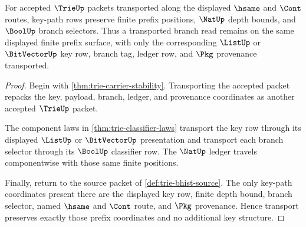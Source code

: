 \begin{theorem}\label{thm:trie-key-prefix-transport}
For accepted $\TrieUp$ packets transported along the displayed $\hsame$ and
$\Cont$ routes, key-path rows preserve finite prefix positions, $\NatUp$ depth
bounds, and $\BoolUp$ branch selectors. Thus a transported branch read remains
on the same displayed finite prefix surface, with only the corresponding
$\ListUp$ or $\BitVectorUp$ key row, branch tag, ledger row, and $\Pkg$
provenance transported.
\end{theorem}
\begin{proof}
Begin with \autoref{thm:trie-carrier-stability}. Transporting the accepted
packet repacks the key, payload, branch, ledger, and provenance coordinates as
another accepted $\TrieUp$ packet.

The component laws in \autoref{thm:trie-classifier-laws} transport the key row
through its displayed $\ListUp$ or $\BitVectorUp$ presentation and transport
each branch selector through its $\BoolUp$ classifier row. The $\NatUp$ ledger
travels componentwise with those same finite positions.

Finally, return to the source packet of \autoref{def:trie-bhist-source}. The
only key-path coordinates present there are the displayed key row, finite depth
bound, branch selector, named $\hsame$ and $\Cont$ route, and $\Pkg$
provenance. Hence transport preserves exactly those prefix coordinates and no
additional key structure.
\end{proof}

